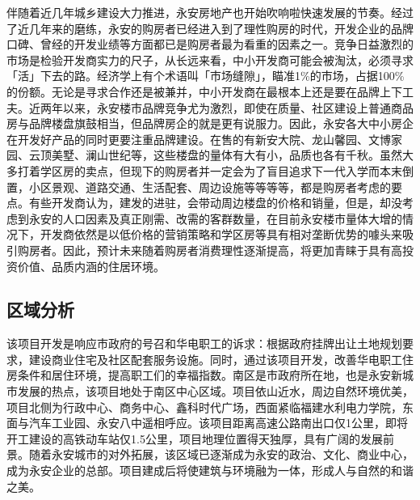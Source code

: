 伴随着近几年城乡建设大力推进，永安房地产也开始吹响啦快速发展的节奏。经过了近几年来的磨练，永安的购房者已经进入到了理性购房的时代，开发企业的品牌口碑、曾经的开发业绩等方面都已是购房者最为看重的因素之一。竞争日益激烈的市场是检验开发商实力的尺子，从长远来看，中小开发商可能会被淘汰，必须寻求「活」下去的路。经济学上有个术语叫「市场缝隙」，瞄准1\%的市场，占据100\%的份额。无论是寻求合作还是被兼并，中小开发商在最根本上还是要在品牌上下工夫。近两年以来，永安楼市品牌竞争尤为激烈，即使在质量、社区建设上普通商品房与品牌楼盘旗鼓相当，但品牌房企的就是更有说服力。因此，永安各大中小房企在开发好产品的同时更要注重品牌建设。在售的有新安大院、龙山馨园、文博家园、云顶美墅、澜山世纪等，这些楼盘的量体有大有小，品质也各有千秋。虽然大多打着学区房的卖点，但现下的购房者并一定会为了盲目追求下一代入学而本末倒置，小区景观、道路交通、生活配套、周边设施等等等等，都是购房者考虑的要点。有些开发商认为，建发的进驻，会带动周边楼盘的价格和销量，但是，却没考虑到永安的人口因素及真正刚需、改需的客群数量，在目前永安楼市量体大增的情况下，开发商依然是以低价格的营销策略和学区房等具有相对垄断优势的噱头来吸引购房者。因此，预计未来随着购房者消费理性逐渐提高，将更加青睐于具有高投资价值、品质内涵的住居环境。

\subsection{区域分析}
该项目开发是响应市政府的号召和华电职工的诉求：根据政府挂牌出让土地规划要求，建设商业住宅及社区配套服务设施。同时，通过该项目开发，改善华电职工住房条件和居住环境，提高职工们的幸福指数。南区是市政府所在地，也是永安新城市发展的热点，该项目地处于南区中心区域。项目依山近水，周边自然环境优美，项目北侧为行政中心、商务中心、鑫科时代广场，西面紧临福建水利电力学院，东面与汽车工业园、永安八中遥相呼应。该项目距离高速公路南出口仅1公里，即将开工建设的高铁动车站仅1.5公里，项目地理位置得天独厚，具有广阔的发展前景。随着永安城市的对外拓展，该区域已逐渐成为永安的政治、文化、商业中心，成为永安企业的总部。项目建成后将使建筑与环境融为一体，形成人与自然的和谐之美。

